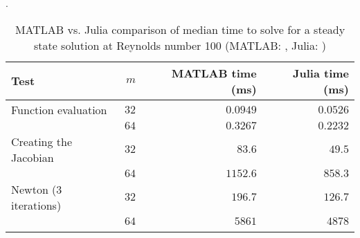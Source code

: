 \begin{table}[ht]
  \caption{MATLAB vs. Julia comparison of median time to solve for a steady
    state solution at Reynolds number 100 (MATLAB: , Julia:
    )}.
  \label{tab:matlab_julia}
\begin{tabular}{lrrr}
Test & $m$ & MATLAB time (ms) & Julia time (ms) \\
\hline
Function evaluation  & $32$ & $0.0949$  & $0.0526$ \\
& $64$ & $0.3267$ & $0.2232$ \\
 Creating the Jacobian  & $32$ & $83.6$  &  $49.5$  \\
& $64$ & $1152.6$ & $858.3$ \\
Newton (3 iterations)  & $32$ & $196.7$ & $126.7$ \\
& $64$ & $5861$  & $4878$ \\
\label{tab:comp}
\end{tabular}
\end{table}
